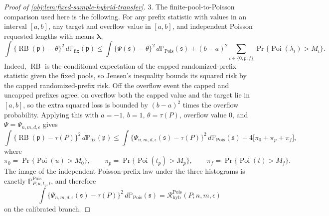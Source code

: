 \begin{proof}[Proof of \cref{obj:lem:fixed-sample-hybrid-transfer}]
3. The finite-pool-to-Poisson comparison used here is the following.  For any prefix statistic with values in an interval \([a,b]\), any target and overflow value in \([a,b]\), and independent Poisson requested lengths with means \(\boldsymbol\lambda\),
\[
\int
\bigl\{\operatorname{RB}(\mathfrak p)-\theta\bigr\}^2
\,d\mathbb P_{\mathrm{fix}}(\mathfrak p)
\le
\int
\bigl\{\Psi(\mathfrak s)-\theta\bigr\}^2
\,d\mathbb P_{\mathrm{Pois}}(\mathfrak s)
+
(b-a)^2
\sum_{\iota\in\{0,p,f\}}
\Pr\{\operatorname{Poi}(\lambda_\iota)>M_\iota\}.
\]
Indeed, \(\operatorname{RB}\) is the conditional expectation of the capped randomized-prefix statistic given the fixed pools, so Jensen's inequality bounds its squared risk by the capped randomized-prefix risk.  Off the overflow event the capped and uncapped prefixes agree; on overflow both the capped value and the target lie in \([a,b]\), so the extra squared loss is bounded by \((b-a)^2\) times the overflow probability.  Applying this with \(a=-1\), \(b=1\), \(\theta=\tau(P)\), overflow value \(0\), and \(\Psi=\Psi_{n,m,d,\epsilon}\) gives
\[
\int
\bigl\{\operatorname{RB}(\mathfrak p)-\tau(P)\bigr\}^2
\,d\mathbb P_{\mathrm{fix}}(\mathfrak p)
\le
\int
\bigl\{\Psi_{n,m,d,\epsilon}(\mathfrak s)-\tau(P)\bigr\}^2
\,d\mathbb P_{\mathrm{Pois}}(\mathfrak s)
+
4\bigl[
\pi_0+\pi_p+\pi_f
\bigr],
\]
where
\[
\pi_0=\Pr\{\operatorname{Poi}(u)>M_0\},\qquad
\pi_p=\Pr\{\operatorname{Poi}(t_p)>M_p\},\qquad
\pi_f=\Pr\{\operatorname{Poi}(t)>M_f\}.
\]
The image of the independent Poisson-prefix law under the three histograms is exactly
\(\mathbb P^{\mathrm{Pois}}_{P,u,t_p,t}\), and therefore
\[
\int
\bigl\{\Psi_{n,m,d,\epsilon}(\mathfrak s)-\tau(P)\bigr\}^2
\,d\mathbb P_{\mathrm{Pois}}(\mathfrak s)
=
\mathcal R^{\mathrm{Pois}}_{\mathrm{hyb}}(P;n,m,\epsilon)
\]
on the calibrated branch. %


\end{proof}
